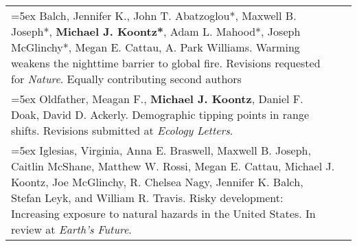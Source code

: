 \begin{longtable}{@{} >{\raggedright}p{5.25in} >{\raggedleft}X @{}}
\hangindent=5ex Balch, Jennifer K., John T. Abatzoglou*, Maxwell B. Joseph*, \textbf{Michael J. Koontz*}, Adam L. Mahood*, Joseph McGlinchy*, Megan E. Cattau, A. Park Williams. Warming weakens the nighttime barrier to global fire. Revisions requested for \emph{Nature}. 
\newline *Equally contributing second authors & 2021 \tabularnewline

\hangindent=5ex Oldfather, Meagan F., \textbf{Michael J. Koontz}, Daniel F. Doak, David D. Ackerly. Demographic tipping points in range shifts. Revisions submitted at \emph{Ecology Letters}. & 2021 \tabularnewline

\hangindent=5ex Iglesias, Virginia, Anna E. Braswell, Maxwell B. Joseph, Caitlin McShane, Matthew W. Rossi, Megan E. Cattau, Michael J. Koontz, Joe McGlinchy, R. Chelsea Nagy, Jennifer K. Balch, Stefan Leyk, and William R. Travis. Risky development: Increasing exposure to natural hazards in the United States. In review at \emph{Earth's Future}. & 2021 \tabularnewline


\end{longtable}
